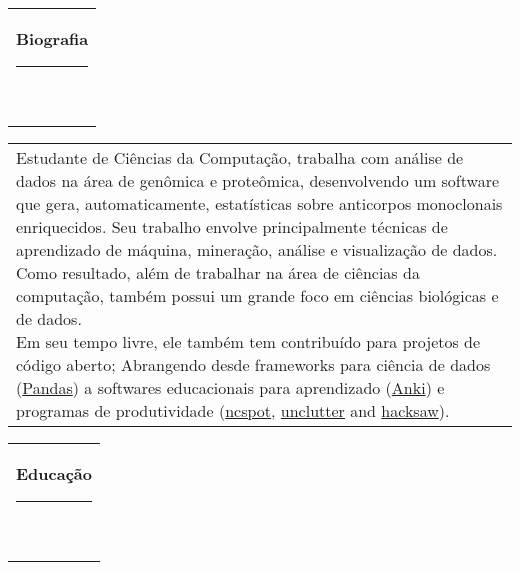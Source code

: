 \documentclass[10pt,A4,english]{article}
\newcommand{\mpwidth}{\linewidth-\fboxsep-\fboxsep}
\newcommand{\cvtext}[1] {
	\begin{tabular*}{1\mpwidth}{p{0.98\mpwidth}}
		\parbox{1\mpwidth}{#1}
	\end{tabular*}
}
\newcommand{\cvsection}[1] {
	\vspace{14pt}
	\cvtext{
		\textbf{\LARGE{\textcolor{darkcol}{#1}}}\\[-4pt]
		\textcolor{accentcol}{ \rule{0.2\textwidth}{1.5pt} } \\
	}
}
\newcommand{\cvqrcode}[1] {
	\begin{center}
		\texttt{[image: qrcode]}
	\end{center}
}
\begin{document}
\begin{paracol}{2}
\begin{leftcolumn}



\end{leftcolumn}
\begin{rightcolumn}


\cvsection{Biografia}
\vspace{4pt}

\cvtext{

  Estudante de Ciências da Computação, trabalha com análise de dados na área de genômica e proteômica, desenvolvendo um software que gera, automaticamente, estatísticas sobre anticorpos monoclonais enriquecidos. Seu trabalho envolve principalmente técnicas de aprendizado de máquina, mineração, análise e visualização de dados. Como resultado, além de trabalhar na área de ciências da computação, também possui um grande foco em ciências biológicas e de dados.\\[-8pt]

  Em seu tempo livre, ele também tem contribuído para projetos de código aberto; Abrangendo desde frameworks para ciência de dados (\href{https://pandas.pydata.org/}{Pandas}) a softwares educacionais para aprendizado (\href{https://apps.ankiweb.net/}{Anki}) e programas de produtividade (\href{https://github.com/hrkfdn/ncspot/}{ncspot}, \href{https://github.com/Airblader/unclutter-xfixes/issues/67}{unclutter} and \href{https://github.com/Cardosaum/hacksaw/}{hacksaw}).



}



\vspace{10pt}
\cvsection{Educação}
\vspace{4pt}



\end{rightcolumn}
\end{paracol}
\end{document}
